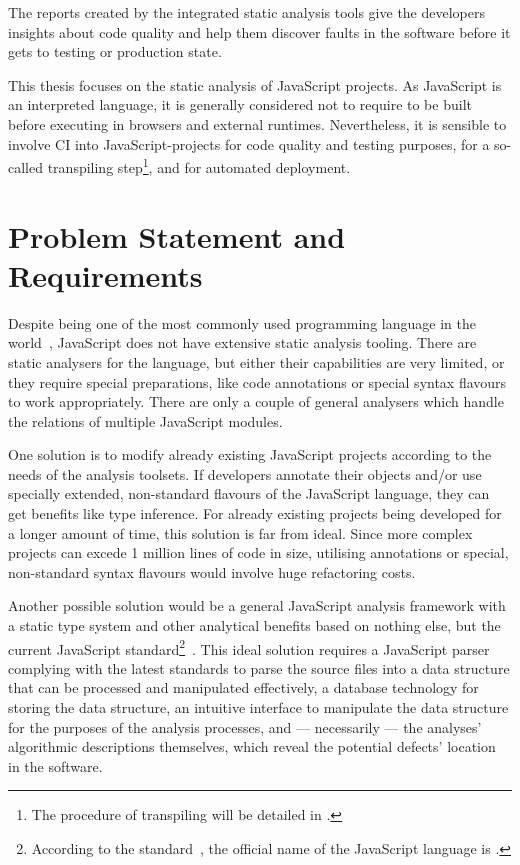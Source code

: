 The reports created by the integrated static analysis tools give the developers insights about code quality and help them discover faults in the software before it gets to testing or production state.

This thesis focuses on the static analysis of JavaScript projects. As JavaScript is an interpreted language, it is generally considered not to require to be built before executing in browsers and external runtimes. Nevertheless, it is sensible to involve CI into JavaScript-projects for code quality and testing purposes, for a so-called transpiling step\footnote{The procedure of transpiling will be detailed in .}, and for automated deployment.


\section{Problem Statement and Requirements}

Despite being one of the most commonly used programming language in the world~\cite{javascriptstackoverflow}, JavaScript does not have extensive static analysis tooling. There are static analysers for the language, but either their capabilities are very limited, or they require special preparations, like code annotations or special syntax flavours to work appropriately. There are only a couple of general analysers which handle the relations of multiple JavaScript modules.

One solution is to modify already existing JavaScript projects according to the needs of the analysis toolsets. If developers annotate their objects and/or use specially extended, non-standard flavours of the JavaScript language, they can get benefits like type inference. For already existing projects being developed for a longer amount of time, this solution is far from ideal. Since more complex projects can excede 1 million lines of code in size, utilising annotations or special, non-standard syntax flavours would involve huge refactoring costs.

Another possible solution would be a general JavaScript analysis framework with a static type system and other analytical benefits based on nothing else, but the current JavaScript standard\footnote{According to the standard~\cite{ecmascriptstandard}, the official name of the JavaScript language is \es.}~\cite{ecmascriptstandard}. This ideal solution requires a JavaScript parser complying with the latest \es standards to parse the source files into a data structure that can be processed and manipulated effectively, a database technology for storing the data structure, an intuitive interface to manipulate the data structure for the purposes of the analysis processes, and — necessarily — the analyses' algorithmic descriptions themselves, which reveal the potential defects' location in the software.

